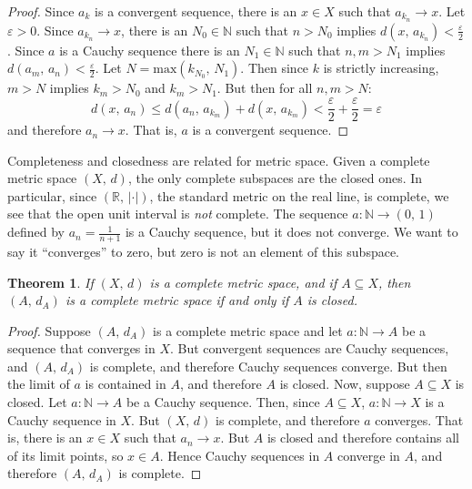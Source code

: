 \documentclass{article}
\theoremstyle{plain}
\newtheorem{theorem}{Theorem}[section]
\theoremstyle{normal}
\begin{document}
        \begin{proof}
            Since $a_{k}$ is a convergent sequence, there is an
            $x\in{X}$ such that $a_{k_{n}}\rightarrow{x}$. Let
            $\varepsilon>0$. Since $a_{k_{n}}\rightarrow{x}$, there is an
            $N_{0}\in\mathbb{N}$ such that $n>N_{0}$ implies
            $d(x,\,a_{k_{n}})<\frac{\varepsilon}{2}$. Since $a$ is a Cauchy
            sequence there is an $N_{1}\in\mathbb{N}$ such that
            $n,m>N_{1}$ implies $d(a_{m},\,a_{n})<\frac{\varepsilon}{2}$.
            Let $N=\textrm{max}(k_{N_{0}},\,N_{1})$.
            Then since $k$ is strictly increasing,
            $m>N$ implies $k_{m}>N_{0}$ and $k_{m}>N_{1}$.
            But then for all $n,m>N$:
            \begin{equation}
                d(x,\,a_{n})\leq{d}(a_{n},\,a_{k_{m}})+d(x,\,a_{k_{m}})
                    <\frac{\varepsilon}{2}+\frac{\varepsilon}{2}=\varepsilon
            \end{equation}
            and therefore $a_{n}\rightarrow{x}$. That is, $a$ is a convergent
            sequence.
        \end{proof}
        Completeness and closedness are related for metric space. Given a
        complete metric space $(X,\,d)$, the only complete subspaces are the
        closed ones. In particular, since $(\mathbb{R},\,|\cdot|)$, the standard
        metric on the real line, is complete, we see that the open unit interval
        is \textit{not} complete. The sequence
        $a:\mathbb{N}\rightarrow(0,\,1)$ defined by $a_{n}=\frac{1}{n+1}$
        is a Cauchy sequence, but it does not converge. We want to say it
        ``converges'' to zero, but zero is not an element of this subspace.
        \begin{theorem}
            If $(X,\,d)$ is a complete metric space, and if
            $A\subseteq{X}$, then $(A,\,d_{A})$ is a complete metric space if
            and only if $A$ is closed.
        \end{theorem}
        \begin{proof}
            Suppose $(A,\,d_{A})$ is a complete metric space and let
            $a:\mathbb{N}\rightarrow{A}$ be a sequence that converges in $X$.
            But convergent sequences are Cauchy sequences, and $(A,\,d_{A})$ is
            complete, and therefore Cauchy sequences converge. But then the
            limit of $a$ is contained in $A$, and therefore $A$ is closed.
            Now, suppose $A\subseteq{X}$ is closed. Let
            $a:\mathbb{N}\rightarrow{A}$ be a Cauchy sequence. Then, since
            $A\subseteq{X}$, $a:\mathbb{N}\rightarrow{X}$ is a Cauchy sequence
            in $X$. But $(X,\,d)$ is complete, and therefore $a$ converges.
            That is, there is an $x\in{X}$ such that $a_{n}\rightarrow{x}$.
            But $A$ is closed and therefore contains all of its limit points,
            so $x\in{A}$. Hence Cauchy sequences in $A$ converge in $A$, and
            therefore $(A,\,d_{A})$ is complete.
        \end{proof}
\end{document}
